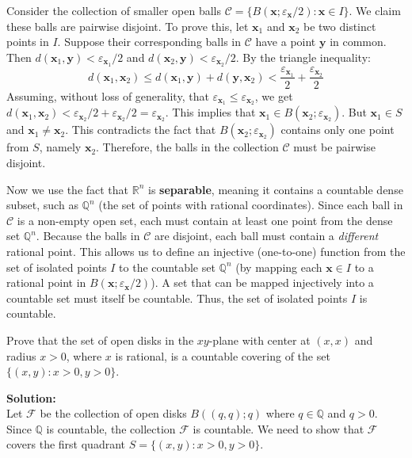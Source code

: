 Consider the collection of smaller open balls $\mathcal{C} = \{ B(\mathbf{x}; \varepsilon_{\mathbf{x}}/2) : \mathbf{x} \in I \}$. We claim these balls are pairwise disjoint.
To prove this, let $\mathbf{x}_1$ and $\mathbf{x}_2$ be two distinct points in $I$. Suppose their corresponding balls in $\mathcal{C}$ have a point $\mathbf{y}$ in common. Then $d(\mathbf{x}_1, \mathbf{y}) < \varepsilon_{\mathbf{x}_1}/2$ and $d(\mathbf{x}_2, \mathbf{y}) < \varepsilon_{\mathbf{x}_2}/2$.
By the triangle inequality:
$$d(\mathbf{x}_1, \mathbf{x}_2) \le d(\mathbf{x}_1, \mathbf{y}) + d(\mathbf{y}, \mathbf{x}_2) < \frac{\varepsilon_{\mathbf{x}_1}}{2} + \frac{\varepsilon_{\mathbf{x}_2}}{2}$$
Assuming, without loss of generality, that $\varepsilon_{\mathbf{x}_1} \le \varepsilon_{\mathbf{x}_2}$, we get $d(\mathbf{x}_1, \mathbf{x}_2) < \varepsilon_{\mathbf{x}_2}/2 + \varepsilon_{\mathbf{x}_2}/2 = \varepsilon_{\mathbf{x}_2}$.
This implies that $\mathbf{x}_1 \in B(\mathbf{x}_2; \varepsilon_{\mathbf{x}_2})$. But $\mathbf{x}_1 \in S$ and $\mathbf{x}_1 \neq \mathbf{x}_2$. This contradicts the fact that $B(\mathbf{x}_2; \varepsilon_{\mathbf{x}_2})$ contains only one point from $S$, namely $\mathbf{x}_2$.
Therefore, the balls in the collection $\mathcal{C}$ must be pairwise disjoint.

Now we use the fact that $\mathbb{R}^n$ is \textbf{separable}, meaning it contains a countable dense subset, such as $\mathbb{Q}^n$ (the set of points with rational coordinates).
Since each ball in $\mathcal{C}$ is a non-empty open set, each must contain at least one point from the dense set $\mathbb{Q}^n$. Because the balls in $\mathcal{C}$ are disjoint, each ball must contain a \textit{different} rational point.
This allows us to define an injective (one-to-one) function from the set of isolated points $I$ to the countable set $\mathbb{Q}^n$ (by mapping each $\mathbf{x} \in I$ to a rational point in $B(\mathbf{x}; \varepsilon_{\mathbf{x}}/2)$). A set that can be mapped injectively into a countable set must itself be countable.
Thus, the set of isolated points $I$ is countable.

\begin{problembox}
Prove that the set of open disks in the \(xy\)-plane with center at \( (x, x) \) and radius \( x > 0 \), where \( x \) is rational, is a countable covering of the set \( \{(x, y) : x > 0, y > 0\} \).
\end{problembox}

\textbf{Solution:}\\
Let $\mathcal{F}$ be the collection of open disks $B((q,q); q)$ where $q \in \mathbb{Q}$ and $q > 0$. Since $\mathbb{Q}$ is countable, the collection $\mathcal{F}$ is countable. We need to show that $\mathcal{F}$ covers the first quadrant $S = \{(x, y) : x > 0, y > 0\}$.

